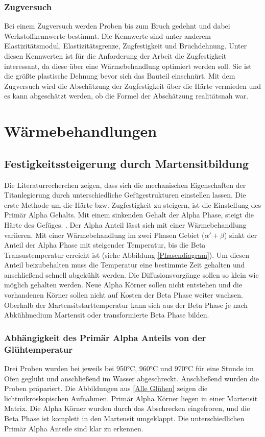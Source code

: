 \documentclass[a4paper, 11pt]{tubsreprt}
\begin{document}
\subsection{Zugversuch}

Bei einem Zugversuch werden Proben bis zum Bruch gedehnt und dabei Werkstoffkennwerte bestimmt. Die Kennwerte sind unter anderem  Elastizitätsmodul, Elastizitätsgrenze, Zugfestigkeit und Bruchdehnung. Unter diesen Kennwerten ist für die Anforderung der Arbeit die Zugfestigkeit interessant, da diese über eine Wärmebehandlung optimiert werden soll. Sie ist die größte plastische Dehnung bevor sich das Bauteil einschnürt. Mit dem Zugversuch wird die Abschätzung der Zugfestigkeit über die Härte vermieden und es kann abgeschätzt werden, ob die Formel der Abschätzung realitätsnah war. 

\chapter{Wärmebehandlungen}
\section{Festigkeitssteigerung durch Martensitbildung}\label{Festigkeitssteigerung durch Martensitbildung}
Die Literaturrecherchen zeigen, dass sich die mechanischen Eigenschaften der Titanlegierung durch unterschiedliche Gefügestrukturen einstellen lassen. Die erste Methode um die Härte bzw. Zugfestigkeit zu steigern, ist die Einstellung des Primär Alpha Gehalts. Mit einem sinkenden Gehalt der Alpha Phase, steigt die Härte des Gefüges. \cite{Sahoo2015}. Der Alpha Anteil lässt sich mit einer Wärmebehandlung variieren. 
Mit einer Wärmebehandlung im zwei Phasen Gebiet ($\alpha'+ \beta$) sinkt der Anteil der Alpha Phase mit steigender Temperatur, bis die Beta Transustemperatur erreicht ist (siehe Abbildung \ref{Phasendiagram}). Um diesen Anteil beizubehalten muss die Temperatur eine bestimmte Zeit gehalten und anschließend schnell abgekühlt werden. Die Diffusionsvorgänge sollen so klein wie möglich gehalten werden. Neue Alpha Körner sollen nicht entstehen und die vorhandenen Körner sollen nicht auf Kosten der Beta Phase weiter wachsen. Oberhalb der Martensitstarttemperatur kann sich aus der Beta Phase je nach Abkühlmedium Martensit oder transformierte Beta Phase bilden.

\subsection{Abhängigkeit des Primär Alpha Anteils von der Glühtemperatur}
Drei Proben wurden bei jeweils bei 950°C, 960°C und 970°C für eine Stunde im Ofen geglüht und anschließend im Wasser abgeschreckt. Anschließend wurden die Proben präpariert. Die Abbildungen aus \ref{Alle Glühen} zeigen die lichtmikroskopischen Aufnahmen. Primär Alpha Körner liegen in einer Martensit Matrix. Die Alpha Körner wurden durch das Abschrecken eingefroren, und die Beta Phase ist komplett in den Martensit umgeklappt. Die unterschiedlichen Primär Alpha Anteile sind klar zu erkennen.
\end{document}
